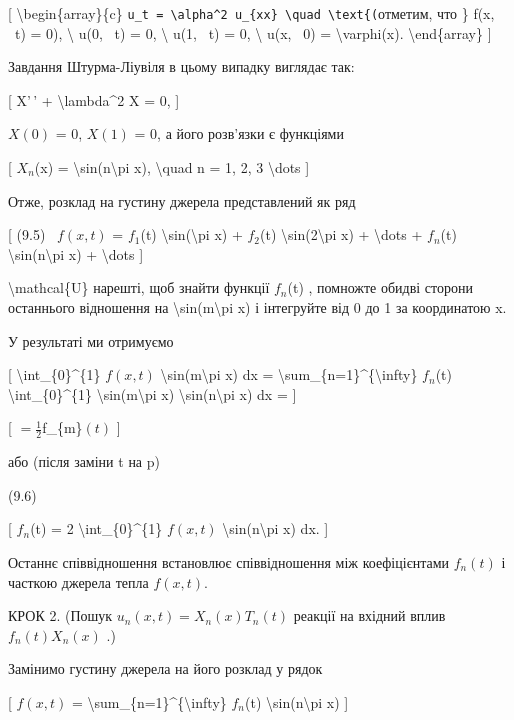 \documentclass[
]{article}
\begin{document}
{{{[} \textbackslash begin\{array\}\{c\}
\texttt{u\_t\ =\ \textbackslash{}alpha\^{}2\ u\_\{xx\}\ \textbackslash{}quad\ \textbackslash{}text\{(}отметим,
что \} f(x, ~t) = 0), \textbackslash{} u(0, ~t) = 0, \textbackslash{}
u(1, ~t) = 0, \textbackslash{} u(x, ~0) = \textbackslash varphi(x).
\textbackslash end\{array\} {]}

Завдання Штурма-Ліувіля в цьому випадку виглядає так:

{[} X'\,' + \textbackslash lambda\^{}2 X = 0, {]}

\(X(0)\) = 0, \(X(1)\) = 0, а його розв'язки є функціями

{[} \(X_n\)(x) = \textbackslash sin(n\textbackslash pi x),
\textbackslash quad n = 1, 2, 3 \textbackslash dots {]}

Отже, розклад на густину джерела представлений як ряд

{[} (9.5) ~\(f(x,t)\) = \(f_1\)(t) \textbackslash sin(\textbackslash pi
x) + \(f_2\)(t) \textbackslash sin(2\textbackslash pi x) +
\textbackslash dots + \(f_n\)(t) \textbackslash sin(n\textbackslash pi
x) + \textbackslash dots {]}

\textbackslash mathcal\{U\} нарешті, щоб знайти функції \(f_n\)(t) ,
помножте обидві сторони останнього відношення на
\textbackslash sin(m\textbackslash pi x) і інтегруйте від 0 до 1 за
координатою x.

У результаті ми отримуємо

{[} \textbackslash int\_\{0\}\^{}\{1\} \(f(x, t)\)
\textbackslash sin(m\textbackslash pi x) dx =
\textbackslash sum\_\{n=1\}\^{}\{\textbackslash infty\} \(f_{n}\)(t)
\textbackslash int\_\{0\}\^{}\{1\} \textbackslash sin(m\textbackslash pi
x) \textbackslash sin(n\textbackslash pi x) dx = {]}

{[} \(= \frac{1}{2}\)f\_\{m\}\((t)\) {]}

або (після заміни t на p)

(9.6)

{[} \(f_{n}\)(t) = 2 \textbackslash int\_\{0\}\^{}\{1\} \(f(x, t)\)
\textbackslash sin(n\textbackslash pi x) dx. {]}

Останнє співвідношення встановлює співвідношення між коефіцієнтами
\(f_n(t)\) і часткою джерела тепла \(f(x, t)\).

КРОК 2. (Пошук \(u_n(x, t) = X_n(x) T_n(t)\) реакції на вхідний вплив
\(f_n(t) X_n(x)\) .)

Замінимо густину джерела на його розклад у рядок

{[} \(f(x, t)\) =
\textbackslash sum\_\{n=1\}\^{}\{\textbackslash infty\} \(f_n\)(t)
\textbackslash sin(n\textbackslash pi x) {]}

}}
\end{document}
